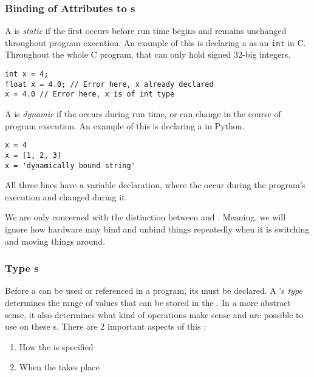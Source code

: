 \subsubsection{Binding of Attributes to s}\label{subsubsec:Binding_Attributes_Variables}
\begin{definition}[Static]\label{def:Static_Variable_Binding}
  A  is \emph{static} if the  first occurs before run time begins and remains unchanged throughout program execution.
  An example of this is declaring a  as an \texttt{int} in C.
  Throughout the whole C program, that  can only hold signed 32-big integers.
\begin{verbatim}
int x = 4;
float x = 4.0; // Error here, x already declared
x = 4.0 // Error here, x is of int type
\end{verbatim}
\end{definition}

\begin{definition}[Dynamic]\label{def:Dynamic_Variable_Binding}
  A  is \emph{dynamic} if the  occurs during run time, or can change in the course of program execution.
  An example of this is declaring a  in Python.
\begin{verbatim}
x = 4
x = [1, 2, 3]
x = 'dynamically bound string'
\end{verbatim}
  All three lines have a variable declaration, where the  occur during the program's execution and changed during it.
\end{definition}

We are only concerned with the distinction between  and   .
Meaning, we will ignore how hardware may bind and unbind things repeatedly when it is switching and moving things around.

\subsubsection{Type s}\label{subsubsec:Type_Bindings}
Before a  can be used or referenced in a program, its  must be declared.
A 's \emph{type} determines the range of values that can be stored in the .
In a more abstract sense, it also determines what kind of operations make sense and are possible to use on these s.
There are 2 important aspects of this :
\begin{enumerate}[noitemsep]
\item How the   is specified
\item When the  takes place
\end{enumerate}

